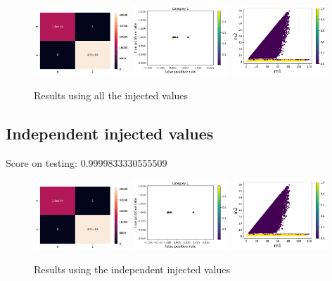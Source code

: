 \documentclass[prd,aps,twocolumn,a4paper,showkeys,nofootinbib]{revtex4-2}
\begin{document}
\begin{figure}[]
\includegraphics[width=0.32\textwidth]{./FigNSclass/CM_inj}
\includegraphics[width=0.32\textwidth]{./FigNSclass/rocCurve_inj}
\includegraphics[width=0.32\textwidth]{./FigNSclass/scatterplot_inj}
\caption{\label{fig:inj} Results using all the injected values }
\end{figure}

\subsection{Independent injected values}
Score on testing:  0.9999833330555509

\begin{figure}[]
\includegraphics[width=0.32\textwidth]{./FigNSclass/CM_ind_inj}
\includegraphics[width=0.32\textwidth]{./FigNSclass/rocCurve_ind_inj}
\includegraphics[width=0.32\textwidth]{./FigNSclass/scatterplot_ind_inj}
\caption{\label{fig:indinj} Results using the independent injected values}
\end{figure}
\end{document}
